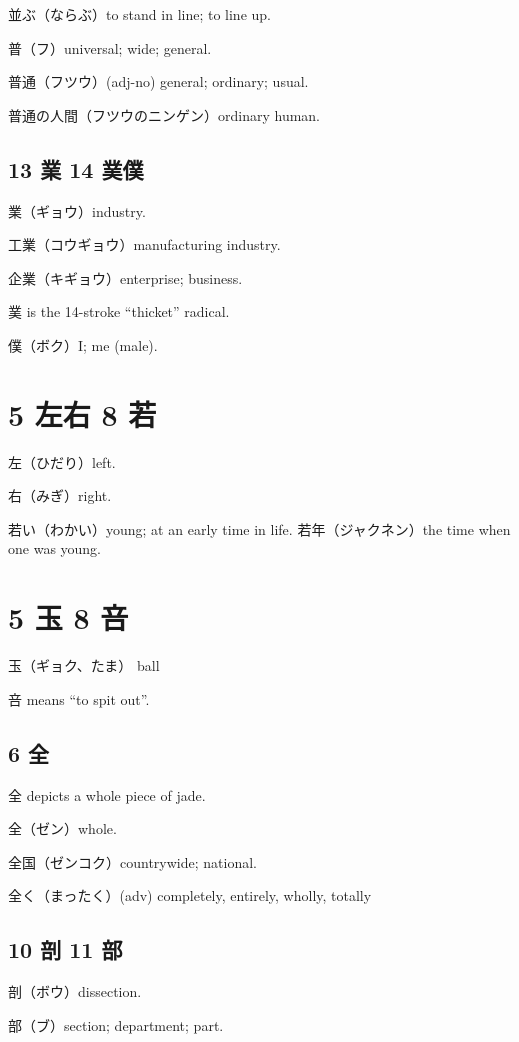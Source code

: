 並ぶ（ならぶ）to stand in line; to line up.

普（フ）universal; wide; general.

普通（フツウ）(adj-no) general; ordinary; usual.

普通の人間（フツウのニンゲン）ordinary human.

\subsection{13 業 14 菐僕}

業（ギョウ）industry.

工業（コウギョウ）manufacturing industry.

企業（キギョウ）enterprise; business.

菐 is the 14-stroke ``thicket'' radical.

僕（ボク）I; me (male).

\section{5 左右 8 若}

左（ひだり）left.

右（みぎ）right.

若い（わかい）young; at an early time in life.
若年（ジャクネン）the time when one was young.

\section{5 玉 8 咅}

玉（ギョク、たま） ball

咅 means ``to spit out''.

\subsection{6 全}

全 depicts a whole piece of jade.

全（ゼン）whole.

全国（ゼンコク）countrywide; national.

全く（まったく）(adv) completely, entirely, wholly, totally

\subsection{10 剖 11 部}

剖（ボウ）dissection.

部（ブ）section; department; part.

